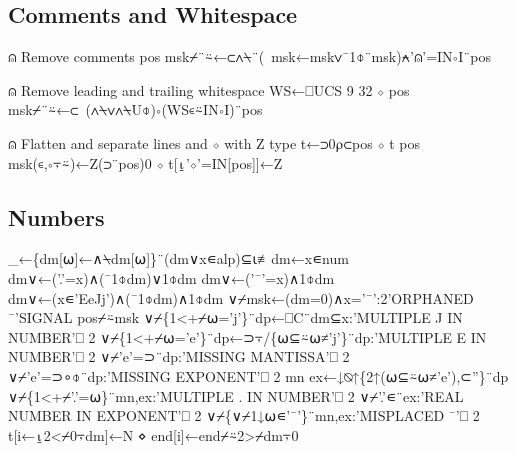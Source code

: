 \documentclass{article}%
\begin{document}
\subsection{Comments and Whitespace}

\nwenddocs{}\endmoddef\nwstartdeflinemarkup{}\nwenddeflinemarkup
⍝ Remove comments
pos msk⌿¨⍨←⊂∧⍀¨(~msk←msk∨¯1⌽¨msk)⍲'⍝'=IN∘I¨pos

⍝ Remove leading and trailing whitespace
WS←⎕UCS 9 32 ⋄ pos msk⌿¨⍨←⊂~(∧⍀∨∧⍀U⌽)∘(WS∊⍨IN∘I)¨pos

⍝ Flatten and separate lines and ⋄ with Z type
t←⊃0⍴⊂pos ⋄ t pos msk(∊,∘⍪⍨)←Z(⊃¨pos)0 ⋄ t[⍸'⋄'=IN[pos]]←Z
\nwendcode{}\nwdocspar

\subsection{Numbers}

\nwenddocs{}\endmoddef\nwstartdeflinemarkup{}\nwenddeflinemarkup
_←\{dm[⍵]←∧⍀dm[⍵]\}¨(dm∨x∊alp)⊆⍳≢dm←x∊num
dm∨←('.'=x)∧(¯1⌽dm)∨1⌽dm
dm∨←('¯'=x)∧1⌽dm
dm∨←(x∊'EeJj')∧(¯1⌽dm)∧1⌽dm
∨⌿msk←(dm=0)∧x='¯':2'ORPHANED ¯'SIGNAL pos⌿⍨msk
∨⌿\{1<+⌿⍵='j'\}¨dp←⎕C¨dm⊆x:'MULTIPLE J IN NUMBER'⎕ 2
∨⌿\{1<+⌿⍵='e'\}¨dp←⊃⍪/\{⍵⊆⍨⍵≠'j'\}¨dp:'MULTIPLE E IN NUMBER'⎕ 2
∨⌿'e'=⊃¨dp:'MISSING MANTISSA'⎕ 2
∨⌿'e'=⊃∘⌽¨dp:'MISSING EXPONENT'⎕ 2
mn ex←↓⍉↑\{2↑(⍵⊆⍨⍵≠'e'),⊂''\}¨dp
∨⌿\{1<+⌿'.'=⍵\}¨mn,ex:'MULTIPLE . IN NUMBER'⎕ 2
∨⌿'.'∊¨ex:'REAL NUMBER IN EXPONENT'⎕ 2
∨⌿\{∨⌿1↓⍵∊'¯'\}¨mn,ex:'MISPLACED ¯'⎕ 2
t[i←⍸2<⌿0⍪dm]←N ⋄ end[i]←end⌿⍨2>⌿dm⍪0
\nwendcode{}\nwdocspar
\end{document}
